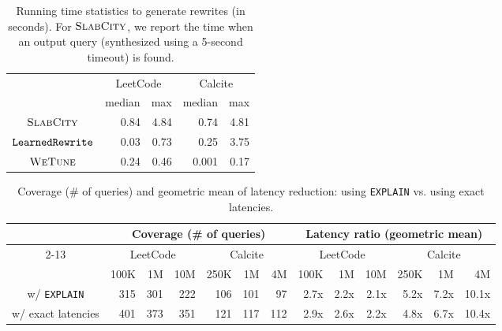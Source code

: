 \begin{table}[!t]
\centering
\footnotesize
\centering
\setlength{\tabcolsep}{6pt}
\def\arraystretch{1.5}
\caption{\small Running time statistics to generate rewrites (in seconds). For $\textsc{SlabCity}$, we report the time when an output query (synthesized using a 5-second timeout) is found.}
\vspace{-5pt}
\begin{tabular}{  c | r r | r r  }
\toprule
& \multicolumn{2}{c|}{LeetCode} 
& \multicolumn{2}{c}{Calcite} 
\\ 
& median 
& max 
& median 
& max 
\\ 
\midrule
$\textsc{SlabCity}$
& {0.84} & {4.84} & 
 {0.74}	&  {4.81}	
\\ 
$\texttt{LearnedRewrite}$
& 0.03 & 0.73 & 0.25	& 3.75	 
\\ 
$\textsc{WeTune}$
& 0.24	& 0.46 &	0.001	& 0.17	
\\ 
\bottomrule
\end{tabular}

\label{slab:tab:running-time-stats}
\end{table}

\begin{table}[!t]
% 
%
\centering
\footnotesize
\centering
\setlength{\tabcolsep}{2pt}
\def\arraystretch{1.1}
\caption{{\small Coverage (\# of queries) and geometric mean of latency reduction: using \texttt{EXPLAIN} vs. using exact latencies.}}
\vspace{-5pt}
\begin{tabular}{  c | r r r | r r r | r r r | r r r }
\toprule
& \multicolumn{6}{c|}{Coverage (\# of queries)} 
& \multicolumn{6}{c}{Latency ratio (geometric mean)} 
\\ 
\cmidrule{2-13}
& \multicolumn{3}{c|}{LeetCode} 
& \multicolumn{3}{c|}{Calcite} 
& \multicolumn{3}{c|}{LeetCode} 
& \multicolumn{3}{c}{Calcite} 
\\ 
& 100K & 1M & 10M 
& 250K & 1M & 4M 
& 100K & 1M & 10M 
& 250K & 1M & 4M 
\\ 
\midrule
w/ \texttt{EXPLAIN} 
& 315 & 301 & 222  & 106 & 101 & 97 
& {2.7x} & {2.2x} & {2.1x}  & {5.2x} & {7.2x} & {10.1x} 
\\ 
w/ exact latencies 
& {401} & {373} & {351}  & {121} & {117} & {112} 
& {2.9x} & {2.6x} & {2.2x}  & {4.8x} & 6.7x & {10.4x} 
\\ 
\bottomrule
\end{tabular}

\label{slab:tab:exact-latencies}
\end{table}


